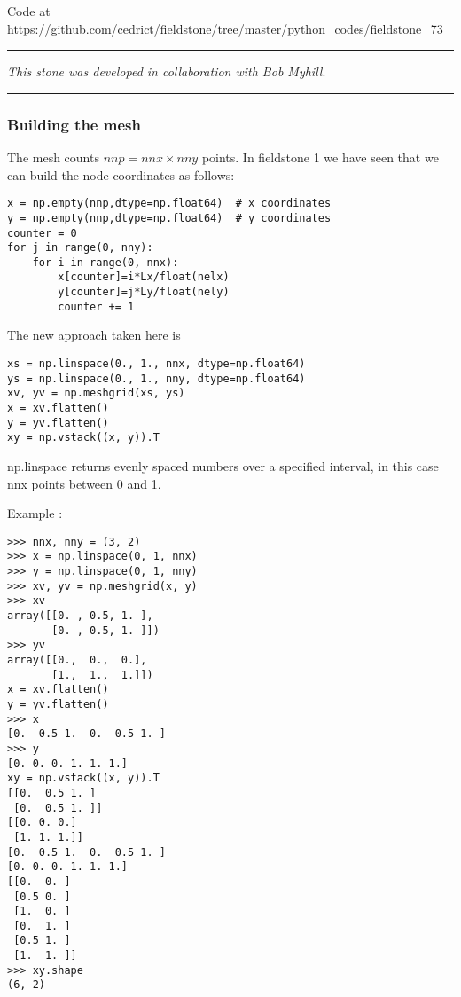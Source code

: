 

\begin{center}
Code at \url{https://github.com/cedrict/fieldstone/tree/master/python_codes/fieldstone_73}
\end{center}

\par\noindent\rule{\textwidth}{0.4pt}

{\sl This stone was developed in collaboration with Bob Myhill}. 

\par\noindent\rule{\textwidth}{0.4pt}


\subsubsection*{Building the mesh}

The mesh counts $nnp=nnx \times nny$ points. 
In fieldstone 1 we have seen that we can build the node coordinates as follows:
\begin{lstlisting}
x = np.empty(nnp,dtype=np.float64)  # x coordinates
y = np.empty(nnp,dtype=np.float64)  # y coordinates
counter = 0
for j in range(0, nny):
    for i in range(0, nnx):
        x[counter]=i*Lx/float(nelx)
        y[counter]=j*Ly/float(nely)
        counter += 1
\end{lstlisting}

The new approach taken here is
\begin{lstlisting}
xs = np.linspace(0., 1., nnx, dtype=np.float64)
ys = np.linspace(0., 1., nny, dtype=np.float64)
xv, yv = np.meshgrid(xs, ys)
x = xv.flatten()
y = yv.flatten()
xy = np.vstack((x, y)).T
\end{lstlisting}

np.linspace returns evenly spaced numbers over a specified interval, 
in this case nnx points between 0 and 1. 

Example :
\begin{verbatim}
>>> nnx, nny = (3, 2)
>>> x = np.linspace(0, 1, nnx)
>>> y = np.linspace(0, 1, nny)
>>> xv, yv = np.meshgrid(x, y)
>>> xv
array([[0. , 0.5, 1. ],
       [0. , 0.5, 1. ]])
>>> yv
array([[0.,  0.,  0.],
       [1.,  1.,  1.]])
x = xv.flatten()
y = yv.flatten()
>>> x
[0.  0.5 1.  0.  0.5 1. ]
>>> y
[0. 0. 0. 1. 1. 1.]
xy = np.vstack((x, y)).T
[[0.  0.5 1. ]
 [0.  0.5 1. ]]
[[0. 0. 0.]
 [1. 1. 1.]]
[0.  0.5 1.  0.  0.5 1. ]
[0. 0. 0. 1. 1. 1.]
[[0.  0. ]
 [0.5 0. ]
 [1.  0. ]
 [0.  1. ]
 [0.5 1. ]
 [1.  1. ]]
>>> xy.shape
(6, 2)
\end{verbatim}



